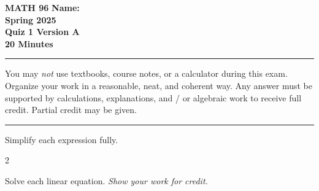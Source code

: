 \documentclass[11pt]{exam}
\begin{document}
\pagestyle{empty}
\textbf{MATH 96}  \textbf{Name:} \makebox[2.77in]{\hrulefill}\\
\textbf{Spring 2025} \\
\textbf{Quiz 1 Version A}\\
\textbf{20 Minutes}   

\rule[1ex]{\textwidth}{.1pt}
You may \emph{not} use textbooks, course notes, or a calculator during this exam. Organize your work in a reasonable, neat, and coherent way.  Any answer must be supported by calculations, explanations, and / or algebraic work to receive full credit. Partial credit may be given.
\vspace{5pt}\\
\rule[1ex]{\textwidth}{.1pt}
\noprintanswers
\begin{questions}
\vspace{-10pt}
\question[8] Simplify each expression fully.
\noaddpoints
\begin{multicols}{2}
\addpoints
\end{multicols}
\vspace{2.75in}
\question[22] Solve each linear equation. \emph{Show your work for credit.}
\noaddpoints
{}
\addpoints
\end{questions}
\end{document}
